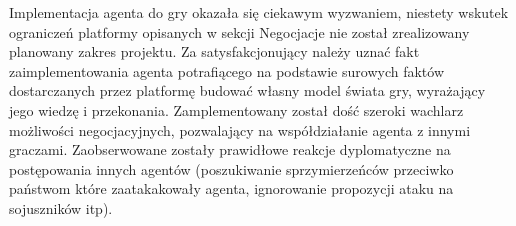Implementacja agenta do gry okazała się ciekawym wyzwaniem, niestety wskutek ograniczeń platformy opisanych w sekcji Negocjacje nie został zrealizowany planowany zakres projektu. Za satysfakcjonujący należy uznać fakt zaimplementowania agenta potrafiącego na podstawie surowych faktów dostarczanych przez platformę budować własny model świata gry, wyrażający jego wiedzę i przekonania. Zamplementowany został dość szeroki wachlarz możliwości negocjacyjnych, pozwalający na współdziałanie agenta z innymi graczami. Zaobserwowane zostały prawidłowe reakcje dyplomatyczne na postępowania innych agentów (poszukiwanie sprzymierzeńców przeciwko państwom które zaatakakowały agenta, ignorowanie propozycji ataku na sojuszników itp).
